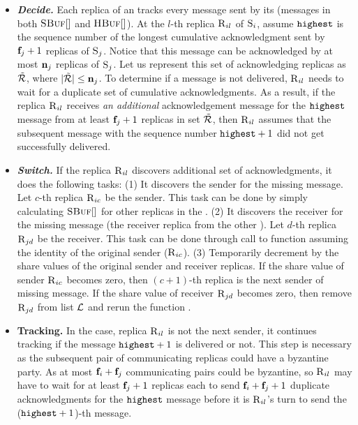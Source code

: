 \begin{itemize}[wide]
\item {\bf \em Decide.}
Each replica of an \RSM{} tracks every message sent by its \RSM{} (messages in both $\textsc{SBuf}[{}]$ and $\textsc{HBuf}[{}]$).
At the $l$-th replica $\textsc{R}_{{i}{l}}$ of \RSM{} $\textsc{S}_{i}$, assume $\texttt{highest}{}$ is the sequence number of the 
longest cumulative acknowledgment sent by $\textbf{f}_{j}+1$ replicas of \RSM{} $\textsc{S}_{j}$.
Notice that this message can be acknowledged by at most $\textbf{n}_{j}$ replicas of \RSM{} $\textsc{S}_{j}$.
Let us represent this set of acknowledging replicas as $\tilde{\mathcal{R}}{}$, where $\lvert \tilde{\mathcal{R}} \rvert \le \textbf{n}_{j}$.
% 
To determine if a message is not delivered, $\textsc{R}_{{i}{l}}$ needs to wait for a duplicate set of cumulative acknowledgments.
As a result, if the replica $\textsc{R}_{{i}{l}}$ receives {\em an additional} acknowledgement message for the $\texttt{highest}{}$ 
message from at least $\textbf{f}_{j}+1$ replicas in set $\tilde{\mathcal{R}}{}$, then $\textsc{R}_{{i}{l}}$ assumes that the subsequent message with the 
sequence number $\texttt{highest} + 1$ did not get successfully delivered.



\item {\bf \em Switch.}
If the replica $\textsc{R}_{{i}{l}}$ discovers additional set of acknowledgments, it does the following tasks:
(1) It discovers the sender for the missing message. 
Let $c$-th replica $\textsc{R}_{{i}{c}}$ be the sender.
This task can be done by simply calculating $\textsc{SBuf}[{}]$ for other replicas in the \RSM{}.
(2) It discovers the receiver for the missing message (the receiver replica from the other \RSM{}).
Let $d$-th replica $\textsc{R}_{{j}{d}}$ be the receiver.
This task can be done through call to \SWS{} function assuming the identity of the original sender ($\textsc{R}_{{i}{c}}$).
(3) Temporarily decrement by the share values of the original sender and receiver replicas. 
If the share value of sender $\textsc{R}_{{i}{c}}$ becomes zero, then $(c+1)$-th replica is the next sender of missing message.
If the share value of receiver $\textsc{R}_{{j}{d}}$ becomes zero, then remove $\textsc{R}_{{j}{d}}$ from list $\mathcal{L}$ and rerun 
the function \SWS{}.



\item {\bf Tracking.}
In the case, replica $\textsc{R}_{{i}{l}}$ is not the next sender, it continues tracking if the message 
$\texttt{highest}+1$ is delivered or not.
This step is necessary as the subsequent pair of communicating replicas could have a byzantine party. 
As at most $\textbf{f}_{i}+\textbf{f}_{j}$ communicating pairs could be byzantine, so $\textsc{R}_{{i}{l}}$ 
may have to wait for at least $\textbf{f}_{j}+1$ replicas each to send $\textbf{f}_{i}+\textbf{f}_{j}+1$ duplicate acknowledgments for the $\texttt{highest}{}$ message 
before it is $\textsc{R}_{{i}{l}}$'s turn to send the ($\texttt{highest}+1$)-th message.


\end{itemize}

